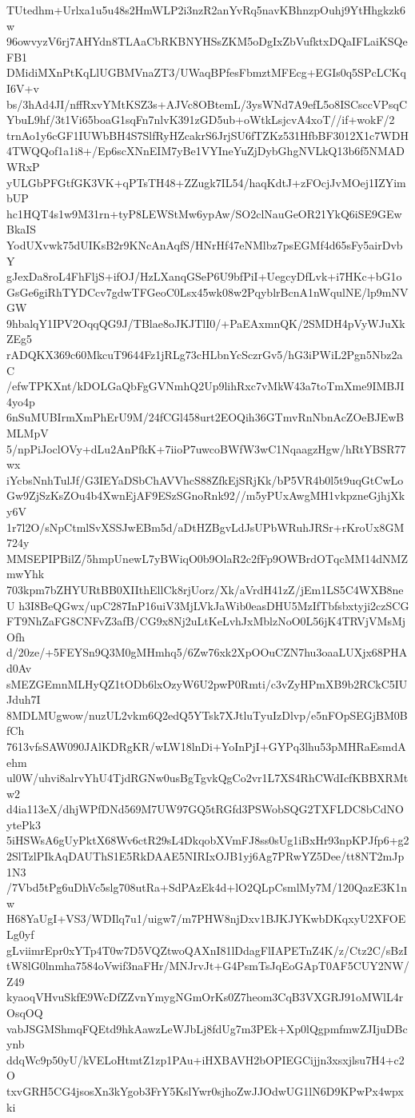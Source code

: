 TUtedhm+Urlxa1u5u48s2HmWLP2i3nzR2anYvRq5navKBhnzpOuhj9YtHhgkzk6w
96owvyzV6rj7AHYdn8TLAaCbRKBNYHSsZKM5oDgIxZbVufktxDQaIFLaiKSQeFB1
DMidiMXnPtKqLlUGBMVnaZT3/UWaqBPfesFbmztMFEcg+EGIs0q5SPcLCKqI6V+v
bs/3hAd4JI/nffRxvYMtKSZ3s+AJVc8OBtemL/3ysWNd7A9efL5o8ISCsccVPsqC
YbuL9hf/3t1Vi65boaG1sqFn7nlvK391zGD5ub+oWtkLsjcvA4xoT//if+wokF/2
trnAo1y6cGF1IUWbBH4S7SlfRyHZcakrS6JrjSU6fTZKz531HfbBF3012X1c7WDH
4TWQQof1a1i8+/Ep6scXNnEIM7yBe1VYIneYuZjDybGhgNVLkQ13b6f5NMADWRxP
yULGbPFGtfGK3VK+qPTsTH48+ZZugk7IL54/haqKdtJ+zFOcjJvMOej1IZYimbUP
hc1HQT4s1w9M31rn+tyP8LEWStMw6ypAw/SO2clNauGeOR21YkQ6iSE9GEwBkaIS
YodUXvwk75dUIKsB2r9KNcAnAqfS/HNrHf47eNMlbz7psEGMf4d65sFy5airDvbY
gJexDa8roL4FhFljS+ifOJ/HzLXanqGSeP6U9bfPiI+UegcyDfLvk+i7HKc+bG1o
GsGe6giRhTYDCcv7gdwTFGeoC0Lsx45wk08w2PqyblrBcnA1nWqulNE/lp9mNVGW
9hbalqY1IPV2OqqQG9J/TBlae8oJKJTlI0/+PaEAxmnQK/2SMDH4pVyWJuXkZEg5
rADQKX369c60MkcuT9644Fz1jRLg73cHLbnYcSczrGv5/hG3iPWiL2Pgn5Nbz2aC
/efwTPKXnt/kDOLGaQbFgGVNmhQ2Up9lihRxc7vMkW43a7toTmXme9IMBJI4yo4p
6nSuMUBIrmXmPhErU9M/24fCGl458urt2EOQih36GTmvRnNbnAcZOeBJEwBMLMpV
5/npPiJoclOVy+dLu2AnPfkK+7iioP7uwcoBWfW3wC1NqaagzHgw/hRtYBSR77wx
iYcbsNnhTulJf/G3IEYaDSbChAVVhcS88ZfkEjSRjKk/bP5VR4b0l5t9uqGtCwLo
Gw9ZjSzKsZOu4b4XwnEjAF9ESzSGnoRnk92//m5yPUxAwgMH1vkpzneGjhjXky6V
1r7l2O/sNpCtmlSvXSSJwEBm5d/aDtHZBgvLdJsUPbWRuhJRSr+rKroUx8GM724y
MMSEPIPBilZ/5hmpUnewL7yBWiqO0b9OlaR2c2fFp9OWBrdOTqcMM14dNMZmwYhk
703kpm7bZHYURtBB0XIIthEllCk8rjUorz/Xk/aVrdH41zZ/jEm1LS5C4WXB8neU
h3I8BeQGwx/upC287InP16uiV3MjLVkJaWib0easDHU5MzIfTbfsbxtyji2czSCG
FT9NhZaFG8CNFvZ3afB/CG9x8Nj2uLtKeLvhJxMblzNoO0L56jK4TRVjVMsMjOfh
d/20ze/+5FEYSn9Q3M0gMHmhq5/6Zw76xk2XpOOuCZN7hu3oaaLUXjx68PHAd0Av
sMEZGEmnMLHyQZ1tODb6lxOzyW6U2pwP0Rmti/c3vZyHPmXB9b2RCkC5IUJduh7I
8MDLMUgwow/nuzUL2vkm6Q2edQ5YTsk7XJtluTyuIzDlvp/e5nFOpSEGjBM0BfCh
7613vfsSAW090JAlKDRgKR/wLW18lnDi+YoInPjI+GYPq3lhu53pMHRaEsmdAehm
ul0W/uhvi8alrvYhU4TjdRGNw0usBgTgvkQgCo2vr1L7XS4RhCWdIcfKBBXRMtw2
d4ia113eX/dhjWPfDNd569M7UW97GQ5tRGfd3PSWobSQG2TXFLDC8bCdNOytePk3
5iHSWsA6gUyPktX68Wv6ctR29sL4DkqobXVmFJ8ss0sUg1iBxHr93npKPJfp6+g2
2SlTzlPIkAqDAUThS1E5RkDAAE5NIRIxOJB1yj6Ag7PRwYZ5Dee/tt8NT2mJp1N3
/7Vbd5tPg6uDhVc5slg708utRa+SdPAzEk4d+lO2QLpCsmlMy7M/120QazE3K1nw
H68YaUgI+VS3/WDIlq7u1/uigw7/m7PHW8njDxv1BJKJYKwbDKqxyU2XFOELg0yf
gLviimrEpr0xYTp4T0w7D5VQZtwoQAXnI81lDdagFlIAPETnZ4K/z/Ctz2C/sBzI
tW8lG0lnmha7584oVwif3naFHr/MNJrvJt+G4PsmTsJqEoGApT0AF5CUY2NW/Z49
kyaoqVHvuSkfE9WcDfZZvnYmygNGmOrKs0Z7heom3CqB3VXGRJ91oMWlL4rOsqOQ
vabJSGMShmqFQEtd9hkAawzLeWJbLj8fdUg7m3PEk+Xp0lQgpmfmwZJIjuDBcynb
ddqWc9p50yU/kVELoHtmtZ1zp1PAu+iHXBAVH2bOPIEGCijjn3xsxjlsu7H4+c2O
txvGRH5CG4jsosXn3kYgob3FrY5KslYwr0sjhoZwJJOdwUG1lN6D9KPwPx4wpxki

